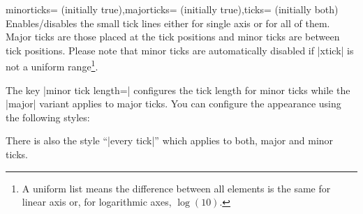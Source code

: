 \begin{pgfplotsxykeylist}{\x minorticks= (initially true),\x majorticks= (initially true),ticks= (initially both)}
Enables/disables the small tick lines either for single axis or for all of them. Major ticks are those placed at the tick positions and minor ticks are between tick positions. Please note that minor ticks are automatically disabled if |xtick| is not a uniform range\footnote{A uniform list means the difference between all elements is the same for linear axis or, for logarithmic axes, $\log(10)$.}.

The key |minor tick length=| configures the tick length for minor ticks while the |major| variant applies to major ticks.
You can configure the appearance using the following styles:
\begin{codeexample}
\end{codeexample}
There is also the style ``|every tick|'' which applies to both, major and minor ticks.
\end{pgfplotsxykeylist}

